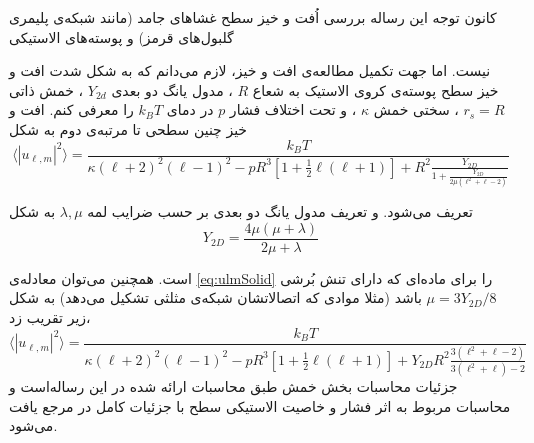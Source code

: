 کانون توجه این رساله بررسی اُفت و خیز سطح غشا‌های جامد (مانند شبکه‌ی پلیمری گلبول‌های قرمز) و پوسته‌های الاستیکی

نیست. اما جهت تکمیل مطالعه‌ی افت و خیز، لازم می‌دانم که به شکل شدت افت و خیز سطح پوسته‌ی کروی الاستیک به شعاع
$R$
، مدول یانگ دو بعدی
$Y_{2d}$
، خمش ذاتی 
$r_s=R$
، سختی خمش
$\kappa$
، و تحت اختلاف فشار 
$p$
در دمای 
$k_BT$
را معرفی کنم. افت و خیز چنین سطحی تا مرتبه‌ی دوم به شکل 
\begin{equation}
\langle|u_{\ell,m}|^2\rangle=\frac{k_BT}{\kappa(\ell+2)^2(\ell-1)^2-pR^3\left[1+\frac{1}{2}\ell(\ell+1)\right]+R^2\frac{Y_{2D}}{1+\frac{Y_{2D}}{2\mu(\ell^2+\ell-2)}}}
\label{eq:ulmSolid}
\end{equation}


تعریف می‌شود. و تعریف مدول یانگ دو بعدی بر حسب ضرایب لمه
$\lambda,\mu$
به شکل
\begin{equation}
Y_{2D}=\frac{4\mu(\mu+\lambda)}{2\mu+\lambda}
\label{eq:youngLame}
\end{equation}

است. همچنین می‌توان معادله‌ی
\ref{eq:ulmSolid}
را برای ماده‌ای که دارای تنش بُرشی 
$\mu=3Y_{2D}/8$
باشد (مثلا موادی که اتصالاتشان شبکه‌ی مثلثی تشکیل می‌دهد) به شکل زیر تقریب زد،
\begin{equation}
\langle|u_{\ell,m}|^2\rangle=\frac{k_BT}{\kappa(\ell+2)^2(\ell-1)^2-pR^3\left[1+\frac{1}{2}\ell(\ell+1)\right]+Y_{2D}R^2\frac{3(\ell^2+\ell-2)}{3(\ell^2+\ell)-2}}
\label{eq:ulmSolidTri}
\end{equation}
جزئیات محاسبات بخش خمش طبق محاسبات ارائه شده در این رساله‌است و محاسبات مربوط به اثر فشار و خاصیت الاستیکی سطح با جزئیات کامل در مرجع
\cite{gomppernelson2012}
یافت می‌شود.
